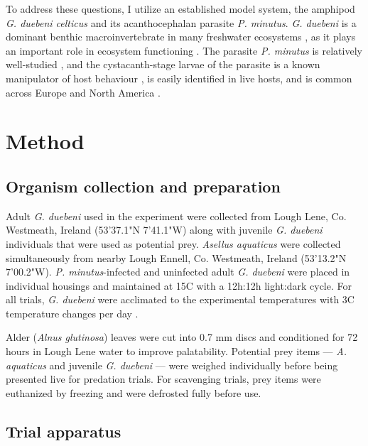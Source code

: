 To address these questions, I utilize an established model system, the amphipod \emph{G. duebeni celticus} and its acanthocephalan parasite \emph{P. minutus}. \emph{G. duebeni} is a dominant benthic macroinvertebrate in many freshwater ecosystems \citep{mortensen1982, kelly2006}, as it plays an important role in ecosystem functioning \citep{macneil1997, sutcliffe2000}. The parasite \emph{P. minutus} is relatively well-studied \citep{dezfuli1999, bailly2017}, and the cystacanth-stage larvae of the parasite is a known manipulator of host behaviour \citep{jacquin2014}, is easily identified in live hosts, and is common across Europe and North America \citep{vancleave1951}. 


\section{Method}

\subsection{Organism collection and preparation}

Adult \emph{G. duebeni} used in the experiment were collected from Lough Lene, Co. Westmeath, Ireland (53'37.1"N 7'41.1"W) along with juvenile \emph{G. duebeni} individuals that were used as potential prey. \emph{Asellus aquaticus} were collected simultaneously from nearby Lough Ennell, Co. Westmeath, Ireland (53'13.2"N 7'00.2"W). \emph{P. minutus}-infected and uninfected adult \emph{G. duebeni} were placed in individual housings and maintained at 15\degree C  with a 12h:12h light:dark cycle. For all trials, \emph{G. duebeni} were acclimated to the experimental temperatures with 3\degree C  temperature changes per day \citep{penk2016}.

Alder (\emph{Alnus glutinosa}) leaves were cut into 0.7 mm discs and conditioned for 72 hours in Lough Lene water to improve palatability. Potential prey items --- \emph{A. aquaticus} and juvenile \emph{G. duebeni} --- were weighed individually before being presented live for predation trials. For scavenging trials, prey items were euthanized by freezing and were defrosted fully before use. 

\subsection{Trial apparatus}

